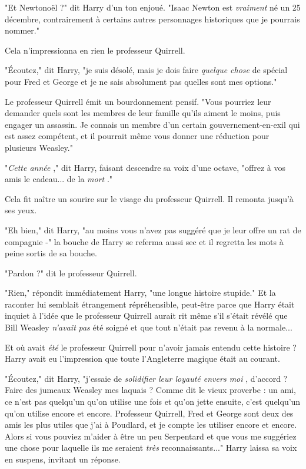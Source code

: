 "Et Newtonoël ?" dit Harry d'un ton enjoué. "Isaac Newton est \emph{vraiment}  né un 25 décembre, contrairement à certains autres personnages historiques que je pourrais nommer."

Cela n'impressionna en rien le professeur Quirrell.

"Écoutez," dit Harry, "je suis désolé, mais je dois faire \emph{quelque chose}  de spécial pour Fred et George et je ne sais absolument pas quelles sont mes options."

Le professeur Quirrell émit un bourdonnement pensif. "Vous pourriez leur demander quels sont les membres de leur famille qu'ils aiment le moins, puis engager un assassin. Je connais un membre d'un certain gouvernement-en-exil qui est assez compétent, et il pourrait même vous donner une réduction pour plusieurs Weasley."

"\emph{Cette année} ," dit Harry, faisant descendre sa voix d'une octave, "offrez à vos amis le cadeau... de la \emph{mort} ."

Cela fit naître un sourire sur le visage du professeur Quirrell. Il remonta jusqu'à ses yeux.

"Eh bien," dit Harry, "au moins vous n'avez pas suggéré que je leur offre un rat de compagnie -" la bouche de Harry se referma aussi sec et il regretta les mots à peine sortis de sa bouche.

"Pardon ?" dit le professeur Quirrell.

"Rien," répondit immédiatement Harry, "une longue histoire stupide." Et la raconter lui semblait étrangement répréhensible, peut-être parce que Harry était inquiet à l'idée que le professeur Quirrell aurait rit même s'il s'était révélé que Bill Weasley \emph{n'avait}  \emph{pas}  été soigné et que tout n'était pas revenu à la normale...

Et où avait \emph{été } le professeur Quirrell pour n'avoir jamais entendu cette histoire ? Harry avait eu l'impression que toute l'Angleterre magique était au courant.

"Écoutez," dit Harry, "j'essaie de \emph{solidifier leur loyauté envers moi} , d'accord ? Faire des jumeaux Weasley mes laquais ? Comme dit le vieux proverbe : un ami, ce n'est pas quelqu'un qu'on utilise une fois et qu'on jette ensuite, c'est quelqu'un qu'on utilise encore et encore. Professeur Quirrell, Fred et George sont deux des amis les plus utiles que j'ai à Poudlard, et je compte les utiliser encore et encore. Alors si vous pouviez m'aider à être un peu Serpentard et que vous me suggériez une chose pour laquelle ils me seraient \emph{très}  reconnaissants..." Harry laissa sa voix en suspens, invitant un réponse.

